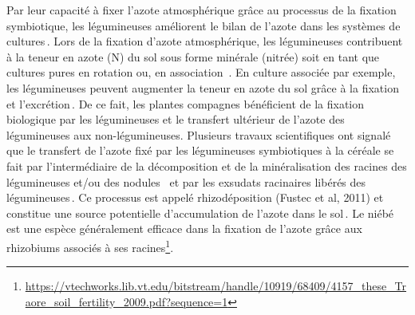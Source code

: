 \documentclass[a4paper,11pt]{article}
\begin{document}
Par leur capacité à fixer l’azote atmosphérique grâce au processus de
la fixation symbiotique, les légumineuses améliorent le bilan de
l'azote dans les systèmes de
cultures\,\cite{Ndakidemi_2005,Fustec11}. Lors de la fixation d’azote
atmosphérique, les légumineuses contribuent à la teneur en azote (N)
du sol sous forme minérale (nitrée) soit en tant que cultures pures en
rotation ou, en association
\,\cite{Bado_2006,Chu_2004,Makoi_2009,Ndakidemi_2005}. En
culture associée par exemple, les légumineuses peuvent augmenter la
teneur en azote du sol grâce à la fixation et
l’excrétion\,\cite{Trenbath_1976,Fustec11}. De ce fait, les plantes
compagnes bénéficient de la fixation biologique par les légumineuses
et le transfert ultérieur de l’azote des légumineuses aux
non-légumineuses. Plusieurs travaux scientifiques ont signalé que le
transfert de l’azote fixé par les légumineuses symbiotiques à la
céréale se fait par l’intermédiaire de la décomposition et de la
minéralisation des racines des légumineuses et/ou des nodules
\,\cite{Burity_1989} et par les exsudats racinaires libérés des
légumineuses\,\cite{Ndakidemi_2005,Makoi_2009}. Ce processus est
appelé rhizodéposition (Fustec et al, 2011) et constitue une source
potentielle d’accumulation de l’azote dans le
sol\,\cite{Koulibi_FideleZONGO}. Le niébé est une espèce généralement
efficace dans la fixation de l’azote grâce aux rhizobiums associés à
ses racines\footnote{\url{https://vtechworks.lib.vt.edu/bitstream/handle/10919/68409/4157_these_Traore_soil_fertility_2009.pdf?sequence=1}}.

\newpage

 
  
\end{document}
